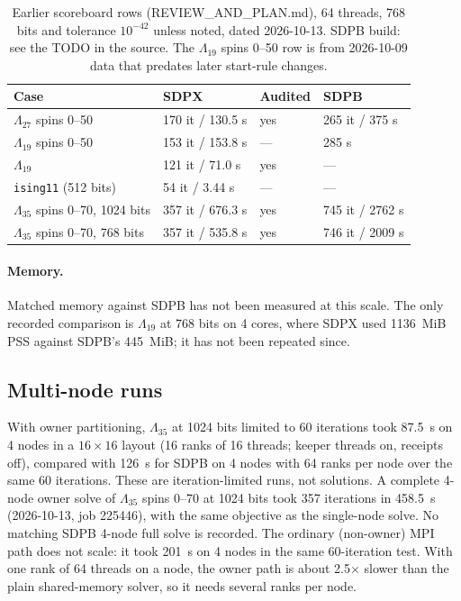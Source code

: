 \documentclass[11pt]{article}
\newcommand{\code}[1]{\texttt{#1}}
\begin{document}
\begin{table}[t]
\centering
\caption{Earlier scoreboard rows (REVIEW\_AND\_PLAN.md), 64 threads, 768 bits
and tolerance $10^{-42}$ unless noted, dated 2026-10-13. SDPB build: see the
TODO in the source. The $\Lambda_{19}$ spins 0--50 row is from 2026-10-09 data
that predates later start-rule changes.}
\label{tab:ising-old}
\begin{tabular}{llll}
\toprule
Case & SDPX & Audited & SDPB \\
\midrule
$\Lambda_{27}$ spins 0--50 & 170 it / 130.5 s & yes & 265 it / 375 s \\
$\Lambda_{19}$ spins 0--50 & 153 it / 153.8 s & --- & 285 s \\
$\Lambda_{19}$ & 121 it / 71.0 s & yes & --- \\
\code{ising11} (512 bits) & 54 it / 3.44 s & --- & --- \\
$\Lambda_{35}$ spins 0--70, 1024 bits & 357 it / 676.3 s & yes & 745 it / 2762 s \\
$\Lambda_{35}$ spins 0--70, 768 bits & 357 it / 535.8 s & yes & 746 it / 2009 s \\
\bottomrule
\end{tabular}
\end{table}

\paragraph{Memory.}
Matched memory against SDPB has not been measured at this scale. The only
recorded comparison is $\Lambda_{19}$ at 768 bits on 4 cores, where SDPX used
1136~MiB PSS against SDPB's 445~MiB; it has not been repeated since.

\subsection{Multi-node runs}
\label{sec:mpi-results}

With owner partitioning, $\Lambda_{35}$ at 1024 bits limited to 60 iterations
took 87.5~s on 4 nodes in a $16\times16$ layout (16 ranks of 16 threads; keeper
threads on, receipts off), compared with 126~s for SDPB on 4 nodes with 64 ranks per
node over the same 60 iterations. These are iteration-limited runs, not
solutions.
A complete 4-node owner solve of $\Lambda_{35}$ spins 0--70 at 1024 bits took
357 iterations in 458.5~s (2026-10-13, job 225446), with the same objective as
the single-node solve. No matching SDPB 4-node full solve is recorded. The
ordinary (non-owner) MPI path does not scale: it took 201~s on 4 nodes in the
same 60-iteration test. With one rank of 64 threads on a node, the owner path
is about 2.5$\times$ slower than the plain shared-memory solver, so it needs
several ranks per node.
\end{document}
